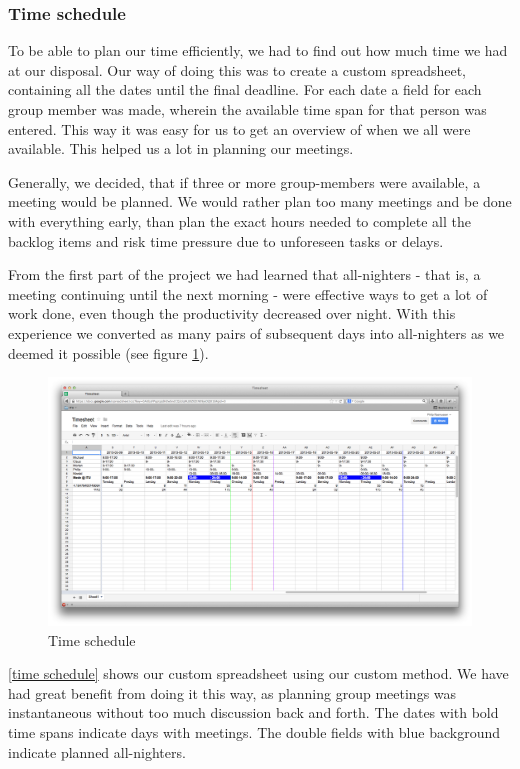 \subsubsection{Time schedule}
To be able to plan our time efficiently, we had to find out how much time we had at our disposal. Our way of doing this was to create a custom spreadsheet, containing all the dates until the final deadline. For each date a field for each group member was made, wherein the available time span for that person was entered. This way it was easy for us to get an overview of when we all were available. This helped us a lot in planning our meetings.

Generally, we decided, that if three or more group-members were available, a meeting would be planned. We would rather plan too many meetings and be done with everything early, than plan the exact hours needed to complete all the backlog items and risk time pressure due to unforeseen tasks or delays.

From the first part of the project we had learned that all-nighters - that is, a meeting continuing until the next morning - were effective ways to get a lot of work done, even though the productivity decreased over night. With this experience we converted as many pairs of subsequent days into all-nighters as we deemed it possible (see figure \ref{fig:time_schedule}).

\begin{figure}[H]
  \includegraphics[width=\textwidth]{illustrations/timeSheet}
  \caption{Time schedule}
  \label{fig:time_schedule}
\end{figure}

\cref{time schedule} shows our custom spreadsheet using our custom method. We have had great benefit from doing it this way, as planning group meetings was instantaneous without too much discussion back and forth. The dates with bold time spans indicate days with meetings. The double fields with blue background indicate planned all-nighters.